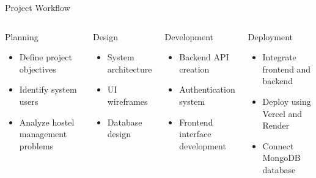 \documentclass{beamer}
\begin{document}
\begin{frame}{Project Workflow}

\begin{columns}


\begin{block}{Planning}
\begin{itemize}
\item Define project objectives
\item Identify system users
\item Analyze hostel management problems
\end{itemize}
\end{block}

\begin{block}{Design}
\begin{itemize}
\item System architecture
\item UI wireframes
\item Database design
\end{itemize}
\end{block}


\begin{block}{Development}
\begin{itemize}
\item Backend API creation
\item Authentication system
\item Frontend interface development
\end{itemize}
\end{block}

\begin{block}{Deployment}
\begin{itemize}
\item Integrate frontend and backend
\item Deploy using Vercel and Render
\item Connect MongoDB database
\end{itemize}
\end{block}

\end{columns}

\end{frame}
\end{document}
